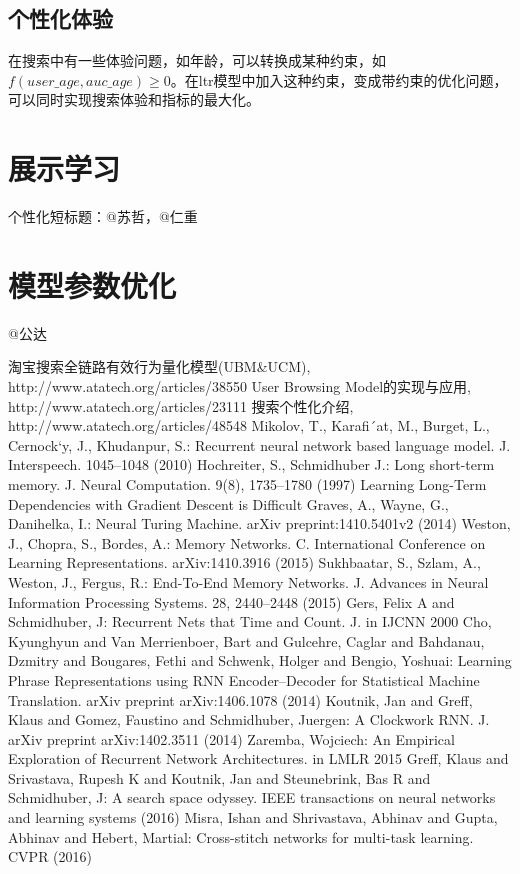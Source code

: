 	\subsection{个性化体验}
	在搜索中有一些体验问题，如年龄，可以转换成某种约束，如$f(user\_age,auc\_age)\geq0$。在ltr模型中加入这种约束，变成带约束的优化问题，可以同时实现搜索体验和指标的最大化。
	

\section{展示学习}
	个性化短标题：@苏哲，@仁重 

\section{模型参数优化} 
	@公达

\begin{thebibliography}{99}
 淘宝搜索全链路有效行为量化模型(UBM\&UCM), http://www.atatech.org/articles/38550
 User Browsing Model的实现与应用, http://www.atatech.org/articles/23111
 搜索个性化介绍, http://www.atatech.org/articles/48548
 Mikolov, T., Karafi´at, M., Burget, L., Cernock`y, J., Khudanpur, S.: Recurrent neural network based language model. J. Interspeech. 1045–1048 (2010)
  Hochreiter, S., Schmidhuber J.: Long short-term memory. J. Neural Computation. 9(8), 1735–1780 (1997)
 Learning Long-Term Dependencies with Gradient Descent is Difficult
 Graves, A., Wayne, G., Danihelka, I.: Neural Turing Machine. arXiv preprint:1410.5401v2 (2014)
 Weston, J., Chopra, S., Bordes, A.: Memory Networks. C. International Conference on Learning Representations. arXiv:1410.3916 (2015)
 Sukhbaatar, S., Szlam, A., Weston, J., Fergus, R.: End-To-End Memory Networks. J. Advances in Neural Information Processing Systems. 28, 2440–2448 (2015)
 Gers, Felix A and Schmidhuber, J: Recurrent Nets that Time and Count. J. in IJCNN 2000
 Cho, Kyunghyun and Van Merrienboer, Bart and Gulcehre, Caglar and Bahdanau, Dzmitry and Bougares, Fethi and Schwenk, Holger and Bengio, Yoshuai: Learning Phrase Representations using RNN Encoder–Decoder for Statistical Machine Translation. arXiv preprint arXiv:1406.1078 (2014)
 Koutnik, Jan and Greff, Klaus and Gomez, Faustino and Schmidhuber, Juergen: A Clockwork RNN. J. arXiv preprint arXiv:1402.3511 (2014)
 Zaremba, Wojciech: An Empirical Exploration of Recurrent Network Architectures. in LMLR 2015
 Greff, Klaus and Srivastava, Rupesh K and Koutnik, Jan and Steunebrink, Bas R and Schmidhuber, J: A search space odyssey. IEEE transactions on neural networks and learning systems (2016)
 Misra, Ishan and Shrivastava, Abhinav and Gupta, Abhinav and Hebert, Martial: Cross-stitch networks for multi-task learning. CVPR (2016)
\end{thebibliography}

 
